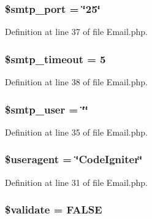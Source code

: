 \subsubsection[{\$smtp\-\_\-port}]{\setlength{\rightskip}{0pt plus 5cm}\$smtp\-\_\-port = \char`\"{}25\char`\"{}}\label{class_c_i___email_af98a134522a65f513cff2718fc74968f}


Definition at line 37 of file Email.\-php.

\subsubsection[{\$smtp\-\_\-timeout}]{\setlength{\rightskip}{0pt plus 5cm}\$smtp\-\_\-timeout = 5}\label{class_c_i___email_afd19e9cbfc82dd26a270fccd29e29728}


Definition at line 38 of file Email.\-php.

\subsubsection[{\$smtp\-\_\-user}]{\setlength{\rightskip}{0pt plus 5cm}\$smtp\-\_\-user = \char`\"{}\char`\"{}}\label{class_c_i___email_ac77010332fb55af4ed3ac38f0e39114d}


Definition at line 35 of file Email.\-php.

\subsubsection[{\$useragent}]{\setlength{\rightskip}{0pt plus 5cm}\$useragent = \char`\"{}Code\-Igniter\char`\"{}}\label{class_c_i___email_adc6d59b7c0768eeffafe3b78c4836959}


Definition at line 31 of file Email.\-php.

\subsubsection[{\$validate}]{\setlength{\rightskip}{0pt plus 5cm}\$validate = F\-A\-L\-S\-E}\label{class_c_i___email_a320b75b46e1832c327d9d47b4cea9e7d}


